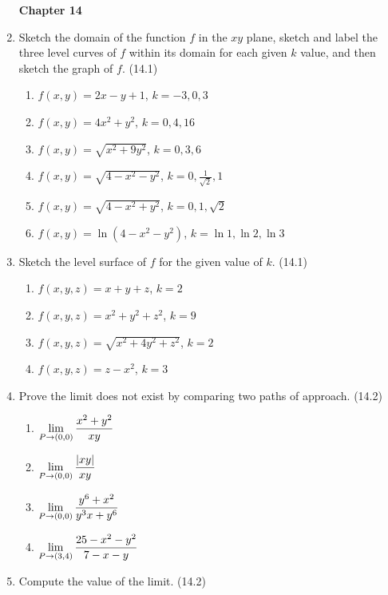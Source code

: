 \begin{enumerate}
\newpage
\centerline{\bf Chapter 14}

    \item Sketch the domain of the function $f$ in the $xy$ plane, sketch and label the three level curves of $f$ within its domain for each given $k$ value, and then sketch the graph of $f$. (14.1)

      \begin{enumerate}
        \item $f(x,y)=2x-y+1$, $k=-3,0,3$ %
        \item $f(x,y)=4x^2+y^2$, $k=0,4,16$
        \item $f(x,y)=\sqrt{x^2+9y^2}$, $k=0,3,6$
        \item $f(x,y)=\sqrt{4-x^2-y^2}$, $k=0,\frac{1}{\sqrt{2}},1$
        \item $f(x,y)=\sqrt{4-x^2+y^2}$, $k=0,1,\sqrt{2}$
        \item $f(x,y)=\ln(4-x^2-y^2)$, $k=\ln1,\ln2,\ln3$
      \end{enumerate}

    \item Sketch the level surface of $f$ for the given value of $k$. (14.1)

      \begin{enumerate}
        \item $f(x,y,z)=x+y+z$, $k=2$
        \item $f(x,y,z)=x^2+y^2+z^2$, $k=9$
        \item $f(x,y,z)=\sqrt{x^2+4y^2+z^2}$, $k=2$
        \item $f(x,y,z)=z-x^2$, $k=3$
      \end{enumerate}

    \item Prove the limit does not exist by comparing two paths of approach. (14.2)

      \begin{enumerate}
        \item $\displaystyle \lim_{P\to(0,0)} \frac{x^2+y^2}{xy}$
        \item $\displaystyle \lim_{P\to(0,0)} \frac{|xy|}{xy}$
        \item $\displaystyle \lim_{P\to(0,0)} \frac{y^6+x^2}{y^3x+y^6}$
        \item $\displaystyle \lim_{P\to(3,4)} \frac{25-x^2-y^2}{7-x-y}$
      \end{enumerate}

    \newpage

    \item Compute the value of the limit. (14.2)


\end{enumerate}
